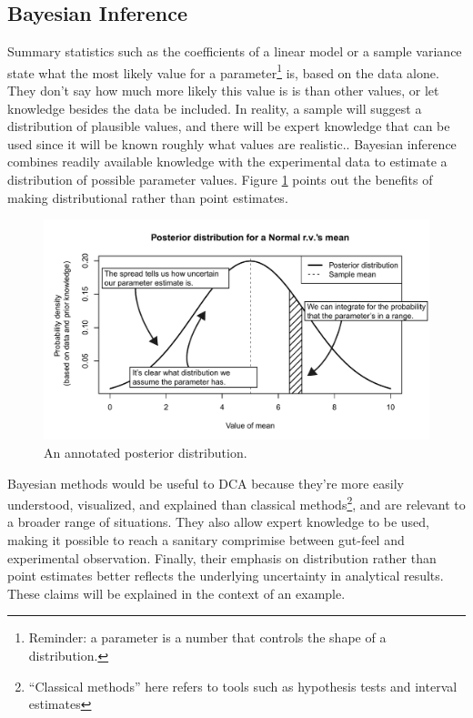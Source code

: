 \documentclass[11pt,a4paper,article]{memoir} %
\begin{document}
\subsection*{Bayesian Inference}
Summary statistics such as the coefficients of a linear model or a sample variance state what the most likely value for a parameter\footnote{Reminder: a parameter is a number that controls the shape of a distribution.} is, based on the data alone. They don't say how much more likely this value is is than other values, or let knowledge besides the data be included. In reality, a sample will suggest a distribution of plausible values, and there will be expert knowledge that can be used since it will be known roughly what values are realistic.. Bayesian inference combines readily available knowledge with the experimental data to estimate a distribution of possible parameter values. Figure \ref{fig:annotated_posterior} points out the benefits of making distributional rather than point estimates.
\begin{figure}[b]
\includegraphics[width=\textwidth]{annotated_posterior.pdf}
\caption{An annotated posterior distribution.}
\label{fig:annotated_posterior}
\end{figure}
\par
Bayesian methods would be useful to DCA because they're more easily understood, visualized, and explained than classical methods\footnote{``Classical methods'' here refers to tools such as hypothesis tests and interval estimates}, and are relevant to a broader range of situations. They also allow expert knowledge to be used, making it possible to reach a sanitary comprimise between gut-feel and experimental observation. Finally, their emphasis on distribution rather than point estimates better reflects the underlying uncertainty in analytical results. These claims will  be explained in the context of an example.
\end{document}
